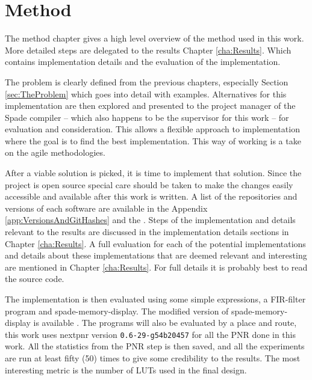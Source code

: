 \chapter{Method}
The method chapter gives a high level overview of the method used in this work. More detailed steps are delegated to the results Chapter \ref{cha:Results}. Which contains implementation details and the evaluation of the implementation.

The problem is clearly defined from the previous chapters, especially Section \ref{sec:TheProblem} which goes into detail with examples. Alternatives for this implementation are then explored and presented to the project manager of the Spade compiler -- which also happens to be the supervisor for this work -- for evaluation and consideration. This allows a flexible approach to implementation where the goal is to find the best implementation. This way of working is a take on the agile methodologies.

After a viable solution is picked, it is time to implement that solution. Since the project is open source special care should be taken to make the changes easily accessible and available after this work is written. A list of the repositories and versions of each software are available in the Appendix \ref{app:VersionsAndGitHashes} and the . Steps of the implementation and details relevant to the results are discussed in the implementation details sections in Chapter \ref{cha:Results}. A full evaluation for each of the potential implementations and details about these implementations that are deemed relevant and interesting are mentioned in Chapter \ref{cha:Results}. For full details it is probably best to read the source code. 

The implementation is then evaluated using some simple expressions, a FIR-filter  program and spade-memory-display. The modified version of spade-memory-display is available . The programs will also be evaluated by a place and route, this work uses nextpnr version \verb+0.6-29-g54b20457+ for all the PNR done in this work. All the statistics from the PNR step is then saved, and all the experiments are run at least fifty (50) times to give some credibility to the results. The most interesting metric is the number of LUTs used in the final design.

